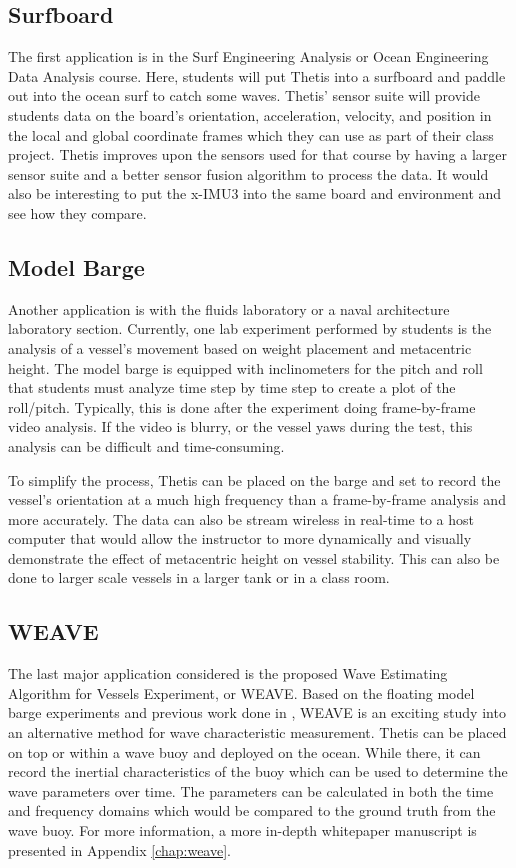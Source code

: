 \subsection{Surfboard} 
The first application is in the Surf Engineering Analysis or Ocean Engineering Data Analysis course.
Here, students will put Thetis into a surfboard and paddle out into the ocean surf to catch some waves.
Thetis' sensor suite will provide students data on the board's orientation, acceleration, velocity, and position in the local and global coordinate frames which they can use as part of their class project.
Thetis improves upon the sensors used for that course by having a larger sensor suite and a better sensor fusion algorithm to process the data.
It would also be interesting to put the x-IMU3 into the same board and environment and see how they compare.

\subsection{Model Barge} 
Another application is with the fluids laboratory or a naval architecture laboratory section.
Currently, one lab experiment performed by students is the analysis of a vessel's movement based on weight placement and metacentric height.
The model barge is equipped with inclinometers for the pitch and roll that students must analyze time step by time step to create a plot of the roll/pitch.
Typically, this is done after the experiment doing frame-by-frame video analysis.
If the video is blurry, or the vessel yaws during the test, this analysis can be difficult and time-consuming.

To simplify the process, Thetis can be placed on the barge and set to record the vessel's orientation at a much high frequency than a frame-by-frame analysis and more accurately.
The data can also be stream wireless in real-time to a host computer that would allow the instructor to more dynamically and visually demonstrate the effect of metacentric height on vessel stability.
This can also be done to larger scale vessels in a larger tank or in a class room.

\subsection{WEAVE} 
The last major application considered is the proposed Wave Estimating Algorithm for Vessels Experiment, or WEAVE.
Based on the floating model barge experiments and previous work done in \cite{Gait-Tracking}, WEAVE is an exciting study into an alternative method for wave characteristic measurement.
Thetis can be placed on top or within a wave buoy and deployed on the ocean.
While there, it can record the inertial characteristics of the buoy which can be used to determine the wave parameters over time.
The parameters can be calculated in both the time and frequency domains which would be compared to the ground truth from the wave buoy.
For more information, a more in-depth whitepaper manuscript is presented in Appendix \ref{chap:weave}.